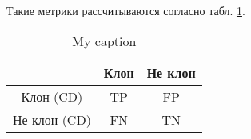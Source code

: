 Такие метрики рассчитываются согласно табл. \ref{truepos}.

\begin{table}[H]
\centering
\captionsetup{skip=5pt}
\caption{My caption}
\label{truepos}
\begin{tabular}{c|c|c|}
\cline{2-3}
                                   & Клон & Не клон \\ \hline
\multicolumn{1}{|c|}{Клон (CD)}    & TP   & FP      \\ \hline
\multicolumn{1}{|c|}{Не клон (CD)} & FN   & TN      \\ \hline
\end{tabular}
\end{table}

